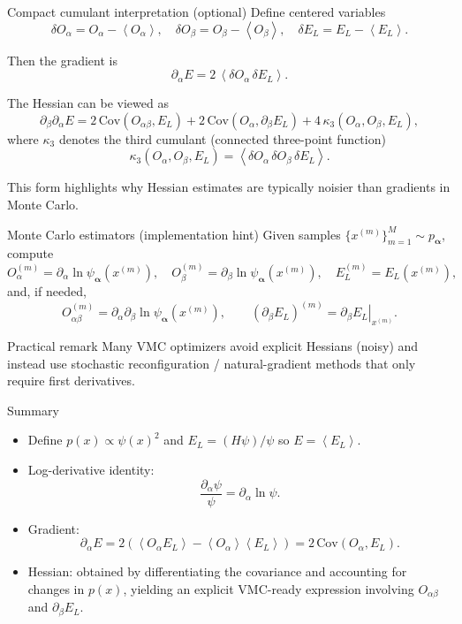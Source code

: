 \documentclass[aspectratio=169]{beamer}
\newcommand{\avg}[1]{\left\langle #1 \right\rangle}
\newcommand{\psia}{\psi_{\bm{\alpha}}}
\newcommand{\El}{E_L}
\newcommand{\Oa}{O_\alpha}
\newcommand{\Ob}{O_\beta}
\newcommand{\Oab}{O_{\alpha\beta}}
\begin{document}
\begin{frame}{Compact cumulant interpretation (optional)}
Define centered variables
\[
\delta \Oa = \Oa-\avg{\Oa},\quad
\delta \Ob=\Ob-\avg{\Ob},\quad
\delta \El=\El-\avg{\El}.
\]

Then the gradient is
\[
\partial_\alpha E = 2\,\avg{\delta\Oa\,\delta\El}.
\]

The Hessian can be viewed as
\[
\partial_\beta\partial_\alpha E
=
2\,\mathrm{Cov}(\Oab,\El)
+2\,\mathrm{Cov}(\Oa,\partial_\beta \El)
+4\,\kappa_3(\Oa,\Ob,\El),
\]
where $\kappa_3$ denotes the third cumulant (connected three-point function)
\[
\kappa_3(\Oa,\Ob,\El)=\avg{\delta\Oa\,\delta\Ob\,\delta\El}.
\]

\smallskip
This form highlights why Hessian estimates are typically noisier than gradients in Monte Carlo.
\end{frame}

\begin{frame}{Monte Carlo estimators (implementation hint)}
Given samples $\{x^{(m)}\}_{m=1}^M \sim p_{\bm{\alpha}}$,
compute
\[
\Oa^{(m)}=\partial_\alpha \ln\psia(x^{(m)}),\quad
\Ob^{(m)}=\partial_\beta \ln\psia(x^{(m)}),\quad
\El^{(m)}=\El(x^{(m)}),
\]
and, if needed,
\[
\Oab^{(m)}=\partial_\alpha\partial_\beta \ln\psia(x^{(m)}),\qquad
(\partial_\beta \El)^{(m)}=\left.\partial_\beta \El\right|_{x^{(m)}}.
\]

\begin{block}{Practical remark}
Many VMC optimizers avoid explicit Hessians (noisy) and instead use
stochastic reconfiguration / natural-gradient methods that only require first derivatives.
\end{block}
\end{frame}

\begin{frame}{Summary}
\begin{itemize}
\item Define $p(x)\propto \psi(x)^2$ and $\El=(H\psi)/\psi$ so $E=\avg{\El}$.
\item Log-derivative identity:
\[
\frac{\partial_\alpha\psi}{\psi}=\partial_\alpha\ln\psi.
\]
\item Gradient:
\[
\partial_\alpha E = 2\left(\avg{\Oa\El}-\avg{\Oa}\avg{\El}\right)=2\,\mathrm{Cov}(\Oa,\El).
\]
\item Hessian: obtained by differentiating the covariance and accounting for changes in $p(x)$,
yielding an explicit VMC-ready expression involving $\Oab$ and $\partial_\beta \El$.
\end{itemize}
\end{frame}
\end{document}

